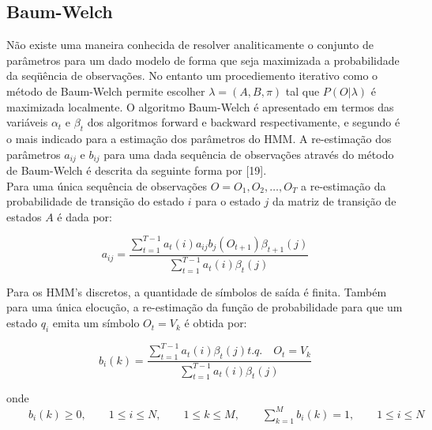 \subsection{Baum-Welch}
\label{secBW}
Não existe uma maneira conhecida de resolver analiticamente o conjunto de parâmetros para um dado modelo de forma que seja maximizada a probabilidade da seqüência de observações. No entanto um procediemento iterativo como o método de Baum-Welch  permite escolher $\lambda = (A, B, \pi)$ tal que $P(O|\lambda)$ é maximizada localmente. O algoritmo Baum-Welch é apresentado em termos das variáveis $\alpha_t$ e $\beta_t$ dos algoritmos forward e backward respectivamente, e segundo  \cite{artRabiner} é o mais indicado para a estimação dos parâmetros do HMM. A re-estimação dos parâmetros $a_{ij}$ e $b_{ij}$ para uma dada sequência de observações através do método de Baum-Welch é descrita da seguinte forma por [19].\\
Para uma única sequência de observações $O = {O_1, O_2, \ldots, O_T}$ a re-estimação da probabilidade de transição do estado $i$ para o estado $j$ da matriz de transição de estados $A$ é dada por:

$$
\displaystyle a_{ij} = \frac{\sum_{t=1}^{T-1} a_t(i)a_{ij}b_j (O_{t+1}) \beta_{t+1}(j)}{\sum_{t=1}^{T-1} a_t(i)\beta_t(j)}
$$

Para os HMM’s discretos, a quantidade de símbolos de saída é finita. Também para uma
única elocução, a re-estimação da função de probabilidade para que um estado $q_i$ emita um símbolo $O_t = V_k $ é obtida por:

$$
b_i(k) = \frac{\sum_{t=1}^{T-1} a_t(i)\beta_t(j) t.q. \quad O_t = V_k}{\sum_{t=1}^{T-1} a_t(i)\beta_t(j)}
$$

onde $ \displaystyle \qquad b_i(k) \geq 0, \qquad 1\leq i \leq N, \qquad 1 \leq k \leq M, \qquad \sum_{k=1}^M b_i(k) = 1, \qquad 1 \leq i \leq N$














